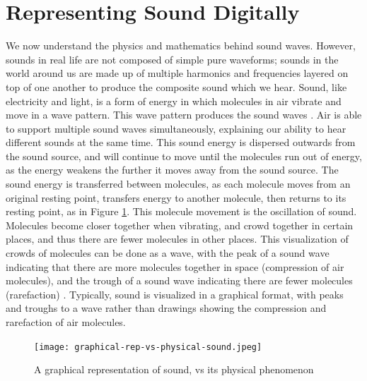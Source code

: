 \section{Representing Sound Digitally}

We now understand the physics and mathematics behind sound waves. However, sounds in real life are not composed of simple pure waveforms; sounds in the world around us are made up of multiple harmonics and frequencies layered on top of one another to produce the composite sound which we hear. Sound, like electricity and light, is a form of energy in which molecules in air vibrate and move in a wave pattern. This wave pattern produces the sound waves \cite{Au-Yeung_2021}. Air is able to support multiple sound waves simultaneously, explaining our ability to hear different sounds at the same time. This sound energy is dispersed outwards from the sound source, and will continue to move until the molecules run out of energy, as the energy weakens the further it moves away from the sound source. The sound energy is transferred between molecules, as each molecule moves from an original resting point, transfers energy to another molecule, then returns to its resting point, as in Figure \ref{fig:graphical-rep-vs-physical-sound}. This molecule movement is the oscillation of sound. Molecules become closer together when vibrating, and crowd together in certain places, and thus there are fewer molecules in other places. This visualization of crowds of molecules can be done as a wave, with the peak of a sound wave indicating that there are more molecules together in space (compression of air molecules), and the trough of a sound wave indicating there are fewer molecules (rarefaction) \cite{Toft_2020}. Typically, sound is visualized in a graphical format, with peaks and troughs to a wave rather than drawings showing the compression and rarefaction of air molecules. 

\begin{figure}
  \centering
  \texttt{[image: graphical-rep-vs-physical-sound.jpeg]}
  \caption{A graphical representation of sound, vs its physical phenomenon}\cite{Toft_2020}
  \label{fig:graphical-rep-vs-physical-sound}
\end{figure}

